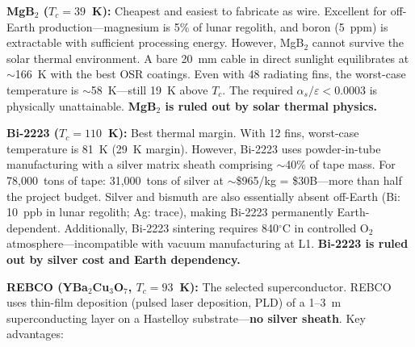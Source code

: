 \documentclass[12pt,letterpaper]{article}
\begin{document}
\textbf{MgB$_2$ ($T_c = 39$~K):} Cheapest and easiest to fabricate as wire. Excellent for off-Earth production---magnesium is 5\% of lunar regolith, and boron (5~ppm) is extractable with sufficient processing energy. However, MgB$_2$ cannot survive the solar thermal environment. A bare 20~mm cable in direct sunlight equilibrates at ${\sim}$166~K with the best OSR coatings. Even with 48 radiating fins, the worst-case temperature is ${\sim}$58~K---still 19~K above $T_c$. The required $\alpha_s/\varepsilon < 0.0003$ is physically unattainable. \textbf{MgB$_2$ is ruled out by solar thermal physics.}

\textbf{Bi-2223 ($T_c = 110$~K):} Best thermal margin. With 12 fins, worst-case temperature is 81~K (29~K margin). However, Bi-2223 uses powder-in-tube manufacturing with a silver matrix sheath comprising ${\sim}$40\% of tape mass. For 78{,}000~tons of tape: 31{,}000~tons of silver at ${\sim}$\$965/kg = \$30B---more than half the project budget. Silver and bismuth are also essentially absent off-Earth (Bi: 10~ppb in lunar regolith; Ag: trace), making Bi-2223 permanently Earth-dependent. Additionally, Bi-2223 sintering requires 840$^\circ$C in controlled O$_2$ atmosphere---incompatible with vacuum manufacturing at L1. \textbf{Bi-2223 is ruled out by silver cost and Earth dependency.}

\textbf{REBCO (YBa$_2$Cu$_3$O$_7$, $T_c = 93$~K):} The selected superconductor. REBCO uses thin-film deposition (pulsed laser deposition, PLD) of a 1--3~\textmu m superconducting layer on a Hastelloy substrate---\textbf{no silver sheath}. Key advantages:
\end{document}
